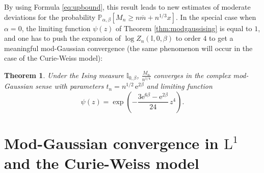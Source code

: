 \documentclass[12pt,a4paper,reqno]{amsart}
\newcommand{\E}{\mathrm{e}}
\newcommand{\proba}{\mathbb{P}}
\newcommand{\IS}{\mathbb{I}}
\newtheorem{theorem}{Theorem}
\theoremstyle{remark}
\begin{document}
By using Formula \ref{eq:upbound}, this result leads to new estimates of moderate deviations for the probability $\proba_{\alpha,\beta}[M_n \geq n\overline{m}+n^{1/3}x]$. In the special case when $\alpha=0$, the limiting function $\psi(z)$ of Theorem \ref{thm:modgaussising} is equal to $1$, and one has to push the expansion of $\log Z_n(\IS,0,\beta)$ to order $4$ to get a meaningful mod-Gaussian convergence (the same phenomenon will occur in the case of the Curie-Weiss model):

\begin{theorem}\label{thm:modgaussising2}
Under the Ising measure $\IS_{0,\beta}$, $\frac{M_n}{n^{1/4}}$ converges in the complex mod-Gaussian sense with parameters $t_n=n^{1/2}\,\E^{2\beta}$ and limiting function 
$$\psi(z)=\exp\left(-\frac{3\E^{6\beta}-\E^{2\beta}}{24}\,z^4\right).$$
\end{theorem}
\bigskip
\bigskip














\section{Mod-Gaussian convergence in $\mathrm{L}^1$ and the Curie-Weiss model}\label{sec:l1}
\end{document}
